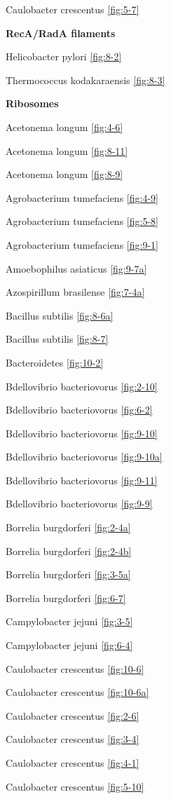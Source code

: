 \documentclass[]{tufte-book}
\begin{document}
Caulobacter crescentus \ref{fig:5-7}

\textbf{RecA/RadA filaments}

Helicobacter pylori \ref{fig:8-2}

Thermococcus kodakaraensis \ref{fig:8-3}

\textbf{Ribosomes}

Acetonema longum \ref{fig:4-6}

Acetonema longum \ref{fig:8-11}

Acetonema longum \ref{fig:8-9}

Agrobacterium tumefaciens \ref{fig:4-9}

Agrobacterium tumefaciens \ref{fig:5-8}

Agrobacterium tumefaciens \ref{fig:9-1}

Amoebophilus asiaticus \ref{fig:9-7a}

Azospirillum brasilense \ref{fig:7-4a}

Bacillus subtilis \ref{fig:8-6a}

Bacillus subtilis \ref{fig:8-7}

Bacteroidetes \ref{fig:10-2}

Bdellovibrio bacteriovorus \ref{fig:2-10}

Bdellovibrio bacteriovorus \ref{fig:6-2}

Bdellovibrio bacteriovorus \ref{fig:9-10}

Bdellovibrio bacteriovorus \ref{fig:9-10a}

Bdellovibrio bacteriovorus \ref{fig:9-11}

Bdellovibrio bacteriovorus \ref{fig:9-9}

Borrelia burgdorferi \ref{fig:2-4a}

Borrelia burgdorferi \ref{fig:2-4b}

Borrelia burgdorferi \ref{fig:3-5a}

Borrelia burgdorferi \ref{fig:6-7}

Campylobacter jejuni \ref{fig:3-5}

Campylobacter jejuni \ref{fig:6-4}

Caulobacter crescentus \ref{fig:10-6}

Caulobacter crescentus \ref{fig:10-6a}

Caulobacter crescentus \ref{fig:2-6}

Caulobacter crescentus \ref{fig:3-4}

Caulobacter crescentus \ref{fig:4-1}

Caulobacter crescentus \ref{fig:5-10}
\end{document}
